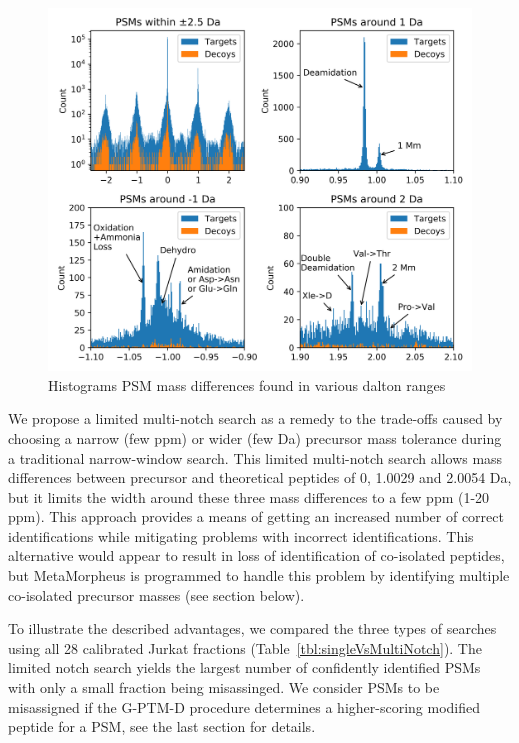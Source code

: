 \documentclass[journal=jprobs,manuscript=article]{achemso}
\begin{document}
\begin{figure}[H]
\includegraphics{fig4jurkat-1012.png}
\caption{Histograms PSM mass differences found in various dalton ranges}
\label{fig:fig4jurkat-1012}
\end{figure}

We propose a limited multi-notch search as a remedy to the trade-offs caused by choosing a narrow (few ppm) or wider (few Da) precursor mass tolerance during a traditional narrow-window search.
This limited multi-notch search allows mass differences between precursor and theoretical peptides of 0, 1.0029 and 2.0054 Da, but it limits the width around these three mass differences to a few ppm (1-20 ppm).
This approach provides a means of getting an increased number of correct identifications while mitigating problems with incorrect identifications.
This alternative would appear to result in loss of identification of co-isolated peptides, but MetaMorpheus is programmed to handle this problem by identifying multiple co-isolated precursor masses (see section below).

To illustrate the described advantages, we compared the three types of searches using all 28 calibrated Jurkat fractions (Table~\ref{tbl:singleVsMultiNotch}).
The limited notch search yields the largest number of confidently identified PSMs with only a small fraction being misassinged.
We consider PSMs to be misassigned if the G-PTM-D procedure determines a higher-scoring modified peptide for a PSM, see the last section for details.
\end{document}
